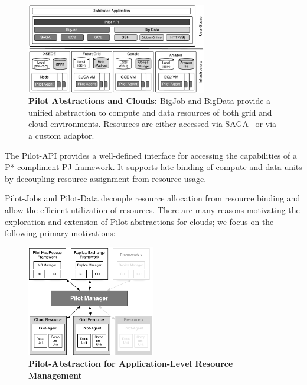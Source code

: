 \documentclass[times]{cpeauth}
\newcommand{\jhanote}[1]{ {\textcolor{red} { ***shantenu: #1 }}}
\newcommand{\jhanote}[1]{}
\newcommand{\pilot}{Pilot\xspace}
\newcommand{\pilotjobs}{Pilot-Jobs\xspace}
\newcommand{\pilotdata}{Pilot-Data\xspace}
\begin{document}
\begin{figure}[t]
	\centering
		\includegraphics[width=0.7\textwidth]{figures/cloud_pilot_job.pdf}
	\caption{\textbf{Pilot Abstractions and Clouds:} BigJob and BigData 
	provide a unified abstraction to compute and data resources of both grid 
	and cloud environments. Resources are either accessed via 
	SAGA~\cite{ogf-gfd-90,saga-bliss-pd} or via a custom adaptor.}
	\label{fig:figures_cloud_pilot_job}
\end{figure}

The \pilot-API provides a well-defined interface for accessing the
capabilities of a P* compliment PJ framework. It supports late-binding of
compute and data units by decoupling resource assignment from resource usage.





\pilotjobs and \pilotdata decouple resource allocation
from resource binding and allow the efficient utilization of
resources.  There are many reasons motivating the exploration and
extension of \pilot abstractions for clouds; we focus on the following
primary motivations:

\begin{figure}[htbp]
	\centering
		\includegraphics[width=0.5\textwidth]{figures/pilot-abstractions.pdf}
	\caption{\textbf{Pilot-Abstraction for Application-Level Resource Management}}
	\label{fig:figures_pilot-abstractions}
\end{figure}
\end{document}
